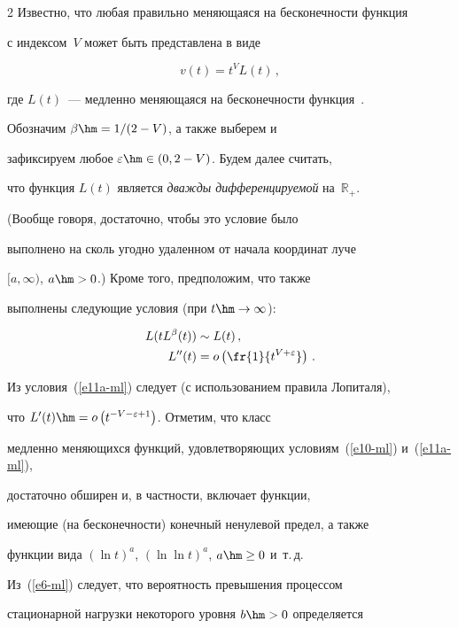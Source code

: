 \begin{multicols}{2}
Известно,  что любая правильно меняющаяся на бесконечности функция


с индексом~$V$ может быть представлена в виде


\begin{equation*}


v(t)=t^V L(t)\,,


\end{equation*}


где $L(t)$~--- медленно меняющаяся на беско\-неч\-ности функция~\cite{Seneta}. 


Обозначим $\beta\hm={1}/(2-V)$, а также выберем и


зафиксируем любое $\varepsilon \hm\in (0,2-V)$. Будем далее считать,


что функция $L(t)$ является {\it дважды дифференцируемой} на~$\mathbb{R}_+$. 


(Вообще говоря, достаточно, чтобы это условие было


выполнено  на сколь угодно удаленном от начала координат луче


$[a,\infty)$, $a\hm>0$.) Кроме того, предположим, что также


выполнены следующие условия (при $t \hm\to \infty$):


\begin{align}


L(tL^\beta(t))& \sim L(t)\,,\label{e10-ml}\\


L''(t)&=o\left( \fr{1}{t^{V+\varepsilon}} \right)\,.\label{e11a-ml}


\end{align}


Из условия~(\ref{e11a-ml}) следует (с использованием правила Лопиталя),


что $L'(t)\hm=o\left(t^{-V-\varepsilon+1} \right)$. Отметим, что класс


медленно меняющихся функций, удовлетворяющих условиям~(\ref{e10-ml}) и~(\ref{e11a-ml}), 


достаточно обширен и, в частности, включает функции,


имеющие (на бесконечности) конечный ненулевой предел, а также


функции вида $(\ln t)^a$, $(\ln\ln t)^a$, $a\hm\ge 0$ и~т.\,д.





Из~(\ref{e6-ml}) следует, что  вероятность превышения процессом


стационарной нагрузки некоторого  уровня  $b\hm>0$ определяется



\end{multicols}
